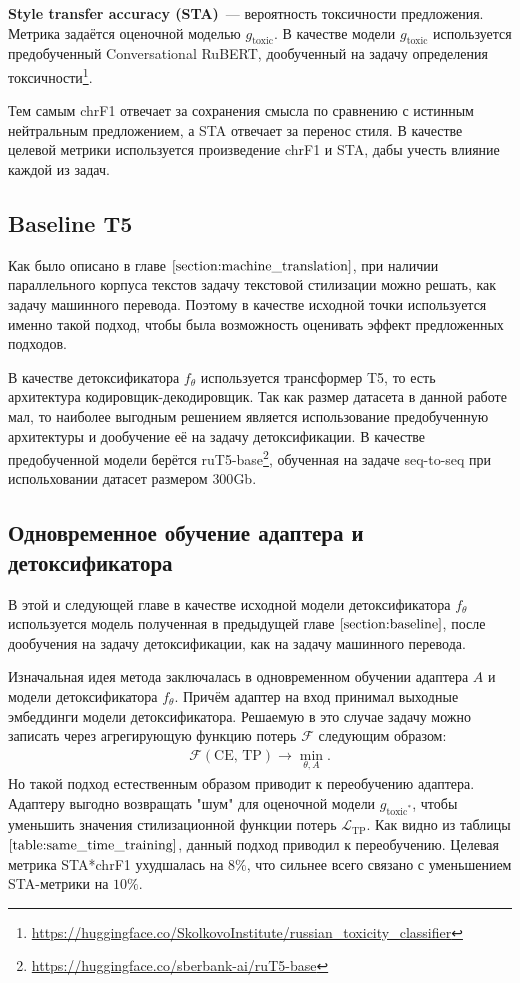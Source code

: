 \textbf{Style transfer accuracy (STA)}~--- вероятность токсичности предложения.
Метрика задаётся оценочной моделью $g_{\text{toxic}}$.
В качестве модели $g_{\text{toxic}}$ используется предобученный Conversational RuBERT, дообученный на задачу определения токсичности\footnote{\url{https://huggingface.co/SkolkovoInstitute/russian_toxicity_classifier}}. 

Тем самым chrF1 отвечает за сохранения смысла по сравнению с истинным нейтральным предложением, а STA отвечает за перенос стиля. 
В качестве целевой метрики используется произведение chrF1 и STA, дабы учесть влияние каждой из задач.

\subsection{Baseline T5}
\label{section:baseline}
Как было описано в главе $\ref{section:machine_translation}$, при наличии параллельного корпуса текстов задачу текстовой стилизации можно решать, как задачу машинного перевода. 
Поэтому в качестве исходной точки используется именно такой подход, чтобы была возможность оценивать эффект предложенных подходов.

В качестве детоксификатора $f_{\theta}$ используется трансформер T5\cite{t5}, то есть архитектура кодировщик-декодировщик.
Так как размер датасета в данной работе мал, то наиболее выгодным решением является использование предобученную архитектуры и дообучение её на задачу детоксификации.
В качестве предобученной модели берётся ruT5-base\footnote{\url{https://huggingface.co/sberbank-ai/ruT5-base}}, обученная на задаче seq-to-seq при испольховании датасет размером $300$Gb. 

\subsection{Одновременное обучение адаптера и детоксификатора}
В этой и следующей главе в качестве исходной модели детоксификатора $f_{\theta}$ используется модель полученная в предыдущей главе $\ref{section:baseline}$, после дообучения на задачу детоксификации, как на задачу машинного перевода.

Изначальная идея метода заключалась в одновременном обучении адаптера $A$ и модели детоксификатора $f_{\theta}$. 
Причём адаптер на вход принимал выходные эмбеддинги модели детоксификатора.
Решаемую в это случае задачу можно записать через агрегирующую функцию потерь $\mathcal{F}$ следующим образом:
\begin{gather*}
    \mathcal{F} (\text{CE, TP}) \longrightarrow \min_{\theta, A}.
\end{gather*}
Но такой подход естественным образом приводит к переобучению адаптера.
Адаптеру выгодно возвращать "шум" для оценочной модели $g_{\text{toxic}^{*}}$, чтобы уменьшить значения стилизационной функции потерь $\mathcal{L}_{\text{TP}}$. 
Как видно из таблицы $\ref{table:same_time_training}$, данный подход приводил к переобучению.
Целевая метрика STA*chrF1 ухудшалась на $8\%$, что сильнее всего связано с уменьшением STA-метрики на $10\%$. 

